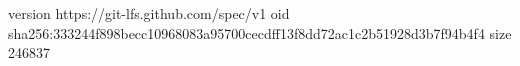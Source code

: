 version https://git-lfs.github.com/spec/v1
oid sha256:333244f898becc10968083a95700cecdff13f8dd72ac1c2b51928d3b7f94b4f4
size 246837
